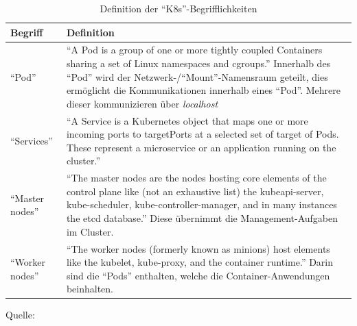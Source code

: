 \begin{table}[h!]
	\centering
	
	\begin{tabular}{@{}lp{12.0cm}@{}}\toprule[1.5pt]
		
		\textbf{Begriff} & \textbf{Definition}  \\ \midrule
		
		\enquote{Pod} & \enquote{A Pod is a group of one or more tightly coupled Containers sharing a set of Linux namespaces and cgroups.} Innerhalb des \enquote{Pod} wird der Netzwerk-/\enquote{Mount}-Namensraum geteilt, dies ermöglicht die Kommunikationen innerhalb eines \enquote{Pod}. Mehrere dieser kommunizieren über \textit{localhost} \\
		
		\enquote{Services} &  \enquote{A Service is a Kubernetes object that maps one or more incoming ports to targetPorts at a selected set of target of Pods. These represent a microservice or an application running on the cluster.} \\
		
		\enquote{Master nodes} & \enquote{The master nodes are the nodes hosting core elements of the control plane like (not an exhaustive list) the kubeapi-server, kube-scheduler, kube-controller-manager, and in many	instances the etcd database.} Diese übernimmt die Management-Aufgaben im Cluster. \\
		
		\enquote{Worker nodes} & \enquote{The worker nodes (formerly known as minions) host elements like the kubelet, kube-proxy, and the container runtime.} Darin sind die \enquote{Pods} enthalten, welche die Container-Anwendungen beinhalten. \\
		
		\bottomrule[1.5pt]
	\end{tabular}
	
	\caption{Definition der \enquote{\ac{K8s}}-Begrifflichkeiten}
	{\footnotesize{Quelle: \cite[][S.10-14]{caban_architecting_2019}}}
	\label{tab:definitionen}
	
\end{table}


